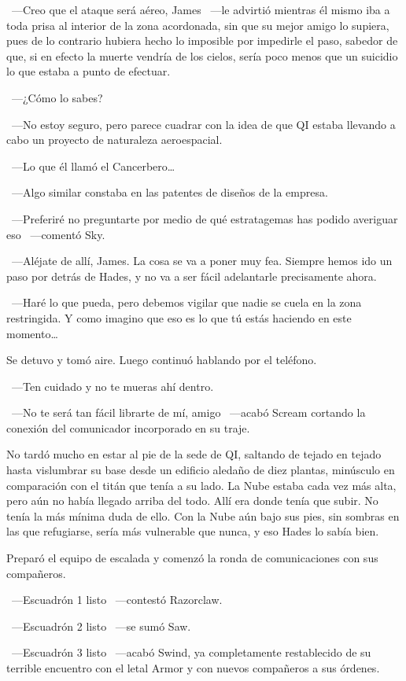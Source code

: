 ~---Creo que el ataque será aéreo, James ~---le advirtió mientras él mismo iba a toda prisa al interior de la zona acordonada, sin que su mejor amigo lo supiera, pues de lo contrario hubiera hecho lo imposible por impedirle el paso, sabedor de que, si en efecto la muerte vendría de los cielos, sería poco menos que un suicidio lo que estaba a punto de efectuar.

~---¿Cómo lo sabes?

~---No estoy seguro, pero parece cuadrar con la idea de que QI estaba llevando a cabo un proyecto de naturaleza aeroespacial.

~---Lo que él llamó el Cancerbero\dots

~---Algo similar constaba en las patentes de diseños de la empresa.

~---Preferiré no preguntarte por medio de qué estratagemas has podido averiguar eso ~---comentó Sky.

~---Aléjate de allí, James. La cosa se va a poner muy fea. Siempre hemos ido un paso por detrás de Hades, y no va a ser fácil adelantarle precisamente ahora.

~---Haré lo que pueda, pero debemos vigilar que nadie se cuela en la zona restringida. Y como imagino que eso es lo que tú estás haciendo en este momento\dots

Se detuvo y tomó aire. Luego continuó hablando por el teléfono.

~---Ten cuidado y no te mueras ahí dentro.

~---No te será tan fácil librarte de mí, amigo ~---acabó Scream cortando la conexión del comunicador incorporado en su traje.

No tardó mucho en estar al pie de la sede de QI, saltando de tejado en tejado hasta vislumbrar su base desde un edificio aledaño de diez plantas, minúsculo en comparación con el titán que tenía a su lado. La Nube estaba cada vez más alta, pero aún no había llegado arriba del todo. Allí era donde tenía que subir. No tenía la más mínima duda de ello. Con la Nube aún bajo sus pies, sin sombras en las que refugiarse, sería más vulnerable que nunca, y eso Hades lo sabía bien.

Preparó el equipo de escalada y comenzó la ronda de comunicaciones con sus compañeros.

~---Escuadrón 1 listo ~---contestó Razorclaw.

~---Escuadrón 2 listo ~---se sumó Saw.

~---Escuadrón 3 listo ~---acabó Swind, ya completamente restablecido de su terrible encuentro con el letal Armor y con nuevos compañeros a sus órdenes.

